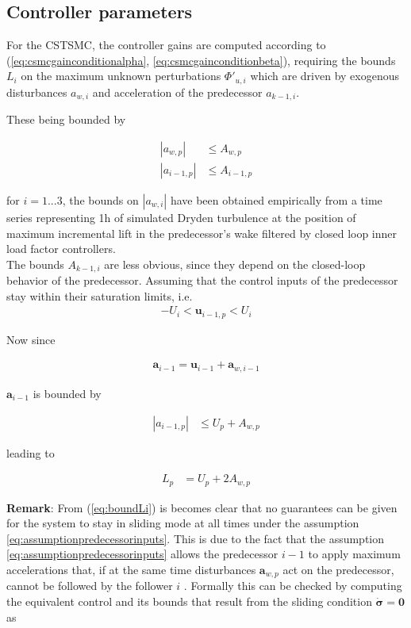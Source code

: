 \documentclass{ifacconf}
\providecommand{\mbf}[1]{\mathbf{#1}}
\newcommand{\idxFollower}{{\ensuremath{i} }}
\newcommand{\idxPredecessor}{{\ensuremath{i-1} }}
\newcommand{\idxAxis}{{\ensuremath{p}}}
\begin{document}
\subsection{Controller parameters}

For the CSTSMC, the controller gains are computed according to (\ref{eq:csmcgainconditionalpha}, \ref{eq:csmcgainconditionbeta}), requiring the bounds $L_i$ on the maximum unknown perturbations $\Phi'_{u,i}$ which are driven by exogenous disturbances $a_{w,i}$ and acceleration of the predecessor $a_{k-1,i}$.

These being bounded by

\begin{align}
|a_{w,\idxAxis}| &\leq A_{w,\idxAxis} \\
|a_{\idxPredecessor,\idxAxis}| &\leq A_{\idxPredecessor,\idxAxis}
\end{align}

for $\idxFollower = 1...3$, the bounds on $|a_{w,i}|$ have been obtained empirically from a time series representing 1h of simulated Dryden turbulence at the position of maximum incremental lift in the predecessor's wake filtered by closed loop inner load factor controllers. \\
The bounds $A_{k-1,i}$ are less obvious, since they depend on the closed-loop behavior of the predecessor. Assuming that the control inputs of the predecessor stay within their saturation limits, i.e. 
\begin{align}
-{U}_i < \mbf{u}_{\idxPredecessor, \idxAxis} < {U}_i 
\label{eq:assumptionpredecessorinputs}
\end{align}

Now since

\begin{align}
\mbf{a}_{\idxPredecessor} = \mbf{u}_{\idxPredecessor} + \mbf{a}_{w, \idxPredecessor}
\end{align}

$\mbf{a}_{\idxPredecessor}$ is bounded by

\begin{align}
|a_{\idxPredecessor,\idxAxis}| &\leq U_\idxAxis + A_{w,\idxAxis}
\end{align}

leading to 

\begin{align}
L_\idxAxis &= U_\idxAxis + 2 A_{w,\idxAxis}
\label{eq:boundLi}
\end{align}

\textbf{Remark}: From (\ref{eq:boundLi}) is becomes clear that no guarantees can be given for the system to stay in sliding mode at all times under the assumption \ref{eq:assumptionpredecessorinputs}. This is due to the fact that the assumption \ref{eq:assumptionpredecessorinputs} allows the predecessor \idxPredecessor to apply maximum accelerations that, if at the same time disturbances $\mbf{a}_{w, \idxAxis}$ act on the predecessor, cannot be followed by the follower \idxFollower. Formally this can be checked by computing the equivalent control and its bounds that result from the sliding condition $\dot{\mbf{\sigma}} = \mbf{0}$ as
\end{document}
